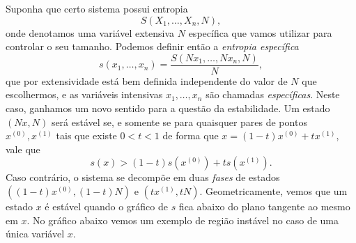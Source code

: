 Suponha que certo sistema possui entropia
$$S(X_1,\dots,X_n,N),$$
onde denotamos uma variável extensiva $N$ específica que vamos utilizar para
controlar o seu tamanho. Podemos definir então a \emph{entropia específica} 
$$s(x_1,\dots,x_n)=\frac{S(Nx_1,\dots,Nx_n,N)}{N},$$
que por extensividade está bem definida independente do valor de $N$ que
escolhermos, e as variáveis intensivas $x_1,\dots,x_n$ são chamadas \emph{
específicas}. Neste caso, ganhamos um novo sentido para a questão da
estabilidade. Um estado $(Nx,N)$ será estável se, e somente se para quaisquer
pares de pontos $x^{(0)},x^{(1)}$ tais que existe $0<t<1$ de forma que $x=(1-t)
x^{(0)}+ tx^{(1)}$, vale que
$$s(x)>(1-t)s(x^{(0)})+ts(x^{(1)}).$$
Caso contrário, o sistema se decompõe em duas \emph{fases} de estados $((1-t)
x^{(0)},(1-t)N)$ e $(tx^{(1)},tN)$. Geometricamente, vemos que um estado $x$ é
estável quando o gráfico de $s$ fica abaixo do plano tangente ao mesmo em $x$.
No gráfico abaixo vemos um exemplo de região instável no caso de uma única
variável $x$.
